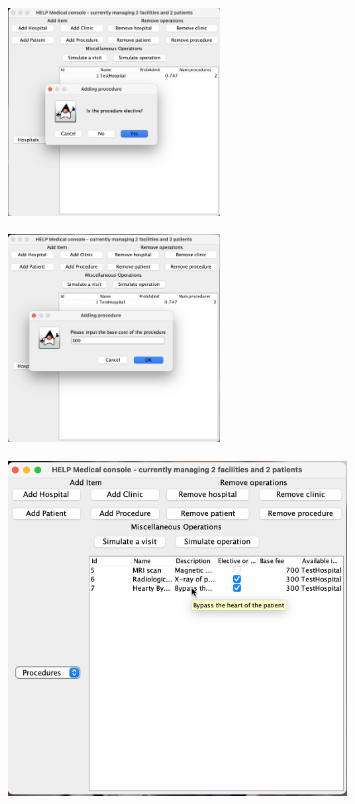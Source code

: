 \documentclass{article}
\begin{document}
\begin{figure}
  \begin{center}
    \includegraphics[width=0.5\textwidth]{./figures/Add/Procedure_4.png}
  \end{center}
\end{figure}

\begin{figure}
  \begin{center}
    \includegraphics[width=0.5\textwidth]{./figures/Add/Procedure_5.png}
  \end{center}
\end{figure}

\begin{figure}
  \begin{center}
    \includegraphics[width=0.8\textwidth]{./figures/Add/Procedure_6.png}
  \end{center}
\end{figure}
\end{document}
